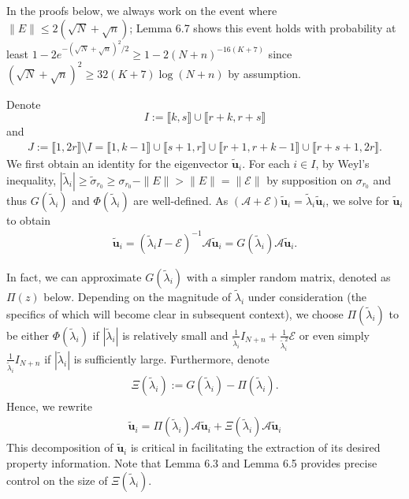 \documentclass[reqno]{amsart}
\theoremstyle{plain}
\theoremstyle{definition}
\begin{document}
In the proofs below, we always work on the event where $\|E\|\le 2(\sqrt{N}+\sqrt n)$; Lemma 6.7 shows this event holds with probability at least $1 - 2 e^{-(\sqrt{N}+\sqrt{n})^2/2}\ge 1 - 2(N+n)^{-16(K+7)}$ since $(\sqrt N+\sqrt n)^2\ge 32(K+7)\log(N+n)$ by assumption.


Denote
$$I:=\llbracket k, s\rrbracket \cup \llbracket r+k, r+s\rrbracket$$
and
 \begin{align*} 
 J:=\llbracket 1, 2r \rrbracket \setminus I = \llbracket 1, k-1\rrbracket\cup \llbracket s+1, r\rrbracket  \cup \llbracket r+1, r+k-1\rrbracket \cup \llbracket r+s+1, 2r\rrbracket .
 \end{align*}
We first obtain an identity for the eigenvector $\widetilde{\mathbf u}_i$. For each $i\in I$, by Weyl's inequality, $|\widetilde \lambda_i| \ge \widetilde \sigma_{r_0}\ge \sigma_{r_0}-\|E\|>\|E\|=\|\mathcal E\|$ by supposition on $\sigma_{r_0}$ and thus $G(\widetilde \lambda_i)$ and $\Phi(\widetilde \lambda_i)$ are well-defined. As $(\mathcal A + \mathcal E)\widetilde{\mathbf u}_i = \widetilde \lambda_i \widetilde{\mathbf u}_i$, we solve for $\widetilde{\mathbf u}_i$  to obtain 
\begin{align*}
	\widetilde{\mathbf u}_i =(\widetilde \lambda_i I - \mathcal E)^{-1} \mathcal A \widetilde{\mathbf u}_i=G(\widetilde \lambda_i) \mathcal A \widetilde{\mathbf u}_i.
\end{align*}  

In fact, we can approximate $G(\widetilde \lambda_i)$ with a simpler random matrix, denoted as $\Pi(z)$ below. Depending on the magnitude of $\widetilde \lambda_i$ under consideration (the specifics of which will become clear in subsequent context), we choose $\Pi(\widetilde \lambda_i)$ to be either $\Phi(\widetilde \lambda_i)$ if $|\widetilde \lambda_i|$ is relatively small and $\frac{1}{\widetilde \lambda_i} I_{N+n} + \frac{1}{\widetilde \lambda_i^2} \mathcal E$ or even simply $\frac{1}{\widetilde \lambda_i} I_{N+n}$ if $|\widetilde \lambda_i|$ is sufficiently large. 
Furthermore, denote 
\begin{align}\label{eq:Xi}
\Xi(\widetilde \lambda_i):=G(\widetilde \lambda_i)-\Pi(\widetilde \lambda_i).
\end{align}
Hence, we rewrite
\begin{align}\label{eq:u}
\widetilde{\mathbf u}_i=\Pi(\widetilde \lambda_i) \mathcal A \widetilde{\mathbf u}_i + \Xi(\widetilde \lambda_i) \mathcal A \widetilde{\mathbf u}_i
\end{align}
This decomposition of $\widetilde{\mathbf u}_i$ is critical in facilitating the extraction of its desired property information. Note that Lemma 6.3 and Lemma 6.5 provides precise control on the size of $\Xi(\widetilde \lambda_i)$.
\end{document}
